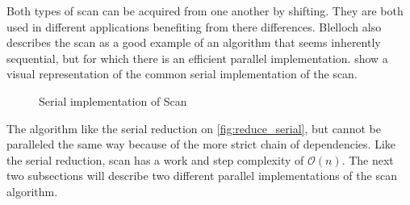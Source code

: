 Both types of scan can be acquired from one another by shifting. They are both used in different applications benefiting from there differences. Blelloch \cite{BlellochTR90} also describes the scan as a good example of an algorithm that seems inherently sequential, but for which there is an efficient parallel implementation.  show a visual representation of the common serial implementation of the scan.  

\begin{figure}[ht]
	\centering
	\caption{Serial implementation of Scan}
	\label{fig:scan_serial}
\end{figure}

The algorithm like the serial reduction on \cref{fig:reduce_serial}, but cannot be paralleled the same way because of the more strict chain of dependencies. Like the serial reduction, scan has a work and step complexity of $\mathcal{O}(n)$. The next two subsections will describe two different parallel implementations of the scan algorithm.